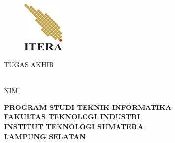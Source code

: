 \clearpage
\pagestyle{empty}

\begin{center}
\smallskip

    \begin{figure}[h]
    	\centering
    	\includegraphics[width=2.1cm, height=2.5cm, keepaspectratio]{resources/itera-logo}
    \end{figure}

	\Large \bfseries \MakeUppercase{\thetitle}
	\vfill

    \Large \uppercase{Tugas Akhir}
    \vfill

    \normalsize \normalfont \theauthor\\
    NIM \printnim
    \vfill

    \large \bfseries
    \uppercase{
        Program Studi Teknik Informatika \\
        Fakultas Teknologi Industri\\
        Institut Teknologi Sumatera\\
        Lampung Selatan
    }\medskip

    \thedate

\end{center}

\clearpage
